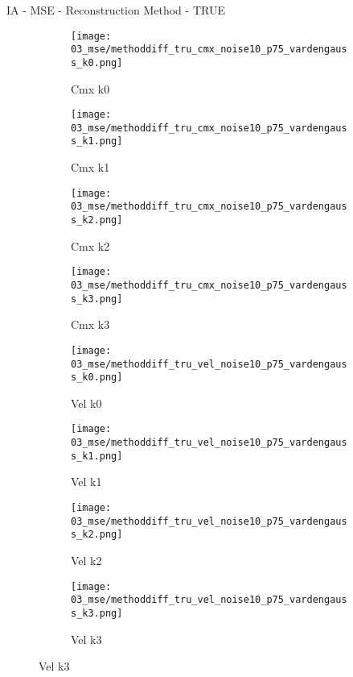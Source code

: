 \documentclass{beamer}
\begin{document}
\begin{frame}{IA - MSE - Reconstruction Method - TRUE}{}
\begin{figure}
\begin{subfigure}{0.24\textwidth}
\texttt{[image: 03\_mse/methoddiff\_tru\_cmx\_noise10\_p75\_vardengauss\_k0.png]}
\vspace{-20pt}
\caption*{\tiny Cmx k0}
\end{subfigure}
\begin{subfigure}{0.24\textwidth}
\texttt{[image: 03\_mse/methoddiff\_tru\_cmx\_noise10\_p75\_vardengauss\_k1.png]}
\vspace{-20pt}
\caption*{\tiny Cmx k1}
\end{subfigure}
\begin{subfigure}{0.24\textwidth}
\texttt{[image: 03\_mse/methoddiff\_tru\_cmx\_noise10\_p75\_vardengauss\_k2.png]}
\vspace{-20pt}
\caption*{\tiny Cmx k2}
\end{subfigure}
\begin{subfigure}{0.24\textwidth}
\texttt{[image: 03\_mse/methoddiff\_tru\_cmx\_noise10\_p75\_vardengauss\_k3.png]}
\vspace{-20pt}
\caption*{\tiny Cmx k3}
\end{subfigure}

\begin{subfigure}{0.24\textwidth}
\texttt{[image: 03\_mse/methoddiff\_tru\_vel\_noise10\_p75\_vardengauss\_k0.png]}
\vspace{-20pt}
\caption*{\tiny Vel k0}
\end{subfigure}
\begin{subfigure}{0.24\textwidth}
\texttt{[image: 03\_mse/methoddiff\_tru\_vel\_noise10\_p75\_vardengauss\_k1.png]}
\vspace{-20pt}
\caption*{\tiny Vel k1}
\end{subfigure}
\begin{subfigure}{0.24\textwidth}
\texttt{[image: 03\_mse/methoddiff\_tru\_vel\_noise10\_p75\_vardengauss\_k2.png]}
\vspace{-20pt}
\caption*{\tiny Vel k2}
\end{subfigure}
\begin{subfigure}{0.24\textwidth}
\texttt{[image: 03\_mse/methoddiff\_tru\_vel\_noise10\_p75\_vardengauss\_k3.png]}
\vspace{-20pt}
\caption*{\tiny Vel k3}
\end{subfigure}
\end{figure}
\end{frame}
\end{document}
